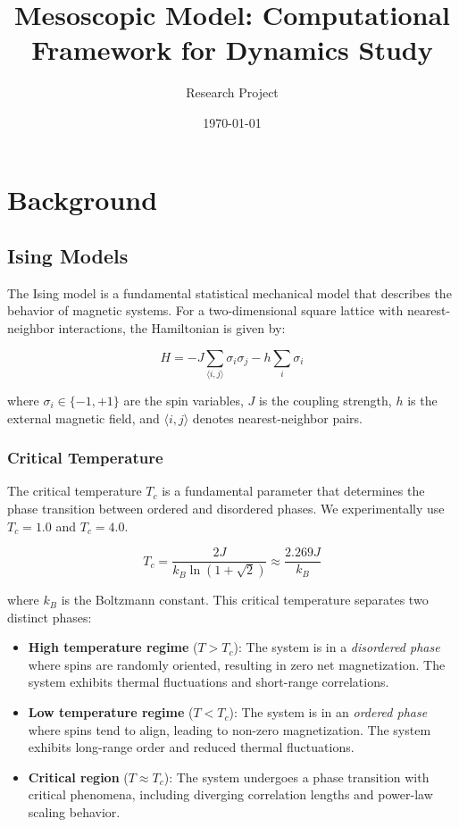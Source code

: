 \documentclass[11pt,a4paper]{article}
\title{Mesoscopic Model: Computational Framework for Dynamics Study}
\author{Research Project}
\date{\today}
\begin{document}
\maketitle

\tableofcontents
\newpage

\section{Background}

\subsection{Ising Models}

The Ising model is a fundamental statistical mechanical model that describes the behavior of magnetic systems. For a two-dimensional square lattice with nearest-neighbor interactions, the Hamiltonian is given by:

\begin{equation}
H = -J \sum_{\langle i,j \rangle} \sigma_i \sigma_j - h \sum_i \sigma_i
\end{equation}

where $\sigma_i \in \{-1, +1\}$ are the spin variables, $J$ is the coupling strength, $h$ is the external magnetic field, and $\langle i,j \rangle$ denotes nearest-neighbor pairs.

\subsubsection{Critical Temperature}

The critical temperature $T_c$ is a fundamental parameter that determines the phase transition between ordered and disordered phases. We experimentally use $T_c = 1.0$ and $T_c = 4.0$.

\begin{equation}
T_c = \frac{2J}{k_B \ln(1 + \sqrt{2})} \approx \frac{2.269J}{k_B}
\end{equation}

where $k_B$ is the Boltzmann constant. This critical temperature separates two distinct phases:

\begin{itemize}
    \item \textbf{High temperature regime} ($T > T_c$): The system is in a \textit{disordered phase} where spins are randomly oriented, resulting in zero net magnetization. The system exhibits thermal fluctuations and short-range correlations.
    
    \item \textbf{Low temperature regime} ($T < T_c$): The system is in an \textit{ordered phase} where spins tend to align, leading to non-zero magnetization. The system exhibits long-range order and reduced thermal fluctuations.
    
    \item \textbf{Critical region} ($T \approx T_c$): The system undergoes a phase transition with critical phenomena, including diverging correlation lengths and power-law scaling behavior.
\end{itemize}
\end{document}
